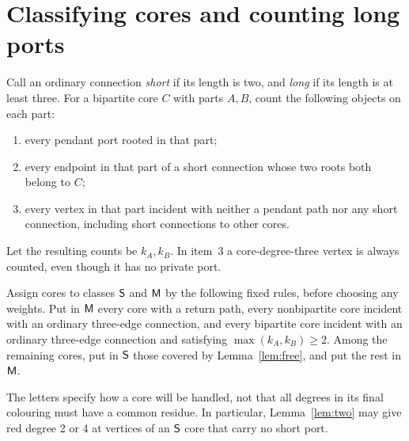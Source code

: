 \section{Classifying cores and counting long ports}\label{sec:class}

Call an ordinary connection \emph{short} if its length is two, and
\emph{long} if its length is at least three.  For a bipartite core $C$
with parts $A,B$, count the following objects on each part:
\begin{enumerate}
\item every pendant port rooted in that part;
\item every endpoint in that part of a short connection whose two roots
both belong to $C$;
\item every vertex in that part incident with neither a pendant path
nor any short connection, including short connections to other cores.
\end{enumerate}
Let the resulting counts be $k_A,k_B$.  In item~3 a core-degree-three
vertex is always counted, even though it has no private port.

Assign cores to classes $\mathsf S$ and $\mathsf M$ by the following fixed rules,
before choosing any weights.  Put in $\mathsf M$ every core with a return
path, every nonbipartite core incident with an ordinary three-edge
connection, and every bipartite core incident with an ordinary
three-edge connection and satisfying $\max(k_A,k_B)\ge2$.
Among the remaining cores, put in $\mathsf S$ those covered by
Lemma~\ref{lem:free}, and put the rest in $\mathsf M$.

The letters specify how a core will be handled, not that all degrees
in its final colouring must have a common residue.  In particular,
Lemma~\ref{lem:two} may give red degree 2 or 4 at vertices of an
$\mathsf S$ core that carry no short port.

